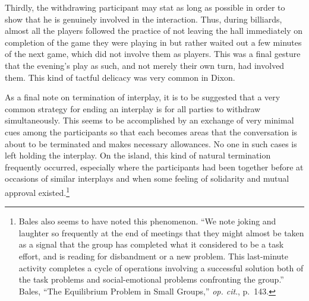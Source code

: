 \documentclass[twoside,symmetric,nobib,justified]{tufte-book}
\begin{document}
Thirdly, the withdrawing participant may stat as long as possible in
order to show that he is genuinely involved in the interaction. Thus,
during billiards, almost all the players followed the practice of not
leaving the hall immediately on completion of the game they were playing
in but rather waited out a few minutes of the next game, which did not
involve them as players. This was a final gesture that the evening's
play as such, and not merely their own turn, had involved them. This
kind of tactful delicacy was very common in Dixon.

As a final note on termination of interplay, it is to be suggested that
a very common strategy for ending an interplay is for all parties to
withdraw simultaneously. This seems to be accomplished by an exchange of
very minimal cues among the participants so that each becomes areas that
the conversation is about to be terminated and makes necessary
allowances. No one in such cases is left holding the interplay. On the
island, this kind of natural termination frequently occurred, especially
where the participants had been together before at occasions of similar
interplays and when some feeling of solidarity and mutual approval
existed.\footnote{Bales also seems to have noted this phenomenon. ``We
  note joking and laughter so frequently at the end of meetings that
  they might almost be taken as a signal that the group has completed
  what it considered to be a task effort, and is reading for disbandment
  or a new problem. This last-minute activity completes a cycle of
  operations involving a successful solution both of the task problems
  and social-emotional problems confronting the group.'' Bales, ``The
  Equilibrium Problem in Small Groups,'' \emph{op. cit}., p.~143.}
\end{document}
